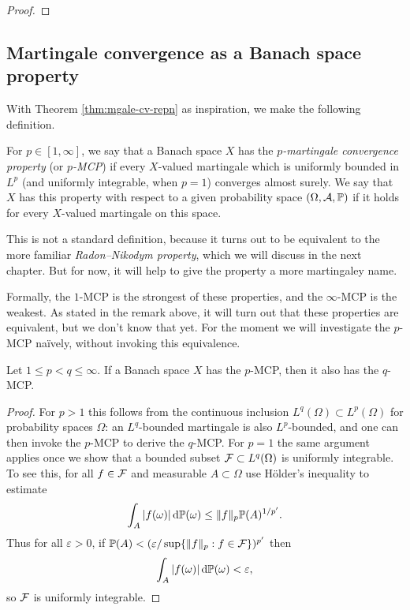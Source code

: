 \begin{proof}
\end{proof}

\subsection{Martingale convergence as a Banach space property}

With Theorem \ref{thm:mgale-cv-repn} as inspiration, we make the following definition.

\begin{defn}
  For $p \in [1,\infty]$, we say that a Banach space $X$ has the \emph{$p$-martingale convergence property} (or \emph{$p$-MCP}) if every $X$-valued martingale which is uniformly bounded in $L^p$ (and uniformly integrable, when $p=1$) converges almost surely.
  We say that $X$ has this property with respect to a given probability space $(\Omega,\mathcal{A},\mathbb{P})$ if it holds for every $X$-valued martingale on this space.
\end{defn}

\begin{rmk}
  This is not a standard definition, because it turns out to be equivalent to the more familiar \emph{Radon--Nikodym property}, which we will discuss in the next chapter. But for now, it will help to give the property a more martingaley name.
\end{rmk}

Formally, the $1$-MCP is the strongest of these properties, and the $\infty$-MCP is the weakest.
As stated in the remark above, it will turn out that these properties are equivalent, but we don't know that yet.
For the moment we will investigate the $p$-MCP na\"ively, without invoking this equivalence.

\begin{prop}
  Let $1 \leq p < q \leq \infty$.
  If a Banach space $X$ has the $p$-MCP, then it also has the $q$-MCP.
\end{prop}

\begin{proof}
  For $p > 1$ this follows from the continuous inclusion $L^q(\Omega) \subset L^p(\Omega)$ for probability spaces $\Omega$: an $L^q$-bounded martingale is also $L^p$-bounded, and one can then invoke the $p$-MCP to derive the $q$-MCP.
  For $p = 1$ the same argument applies once we show that a bounded subset $\mathcal{F} \subset L^q(\Omega)$ is uniformly integrable.
  To see this, for all $f \in \mathcal{F}$ and measurable $A \subset \Omega$ use H\"older's inequality to estimate
  \begin{equation*}
    \int_{A} |f(\omega)| \, \mathrm{d}\mathbb{P}(\omega) \leq \|f\|_{p} \mathbb{P}(A)^{1/p'}.
  \end{equation*}
  Thus for all $\varepsilon > 0$, if $\mathbb{P}(A) < (\varepsilon/\sup\{\|f\|_p : f \in \mathcal{F}\})^{p'}$ then
  \begin{equation*}
    \int_{A} |f(\omega)| \, \mathrm{d}\mathbb{P}(\omega) < \varepsilon,
  \end{equation*}
  so $\mathcal{F}$ is uniformly integrable.
  
\end{proof}


